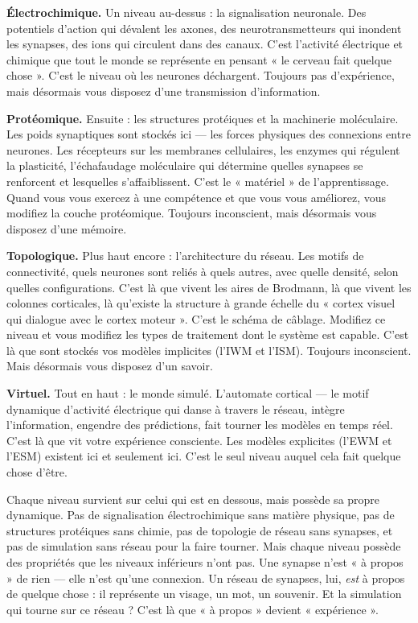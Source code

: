 \documentclass[11pt, twoside, openright]{book}
\begin{document}
\textbf{Électrochimique.} Un niveau au-dessus : la signalisation neuronale. Des potentiels d'action qui dévalent les axones, des neurotransmetteurs qui inondent les synapses, des ions qui circulent dans des canaux. C'est l'activité électrique et chimique que tout le monde se représente en pensant « le cerveau fait quelque chose ». C'est le niveau où les neurones déchargent. Toujours pas d'expérience, mais désormais vous disposez d'une transmission d'information.

\textbf{Protéomique.} Ensuite : les structures protéiques et la machinerie moléculaire. Les poids synaptiques sont stockés ici --- les forces physiques des connexions entre neurones. Les récepteurs sur les membranes cellulaires, les enzymes qui régulent la plasticité, l'échafaudage moléculaire qui détermine quelles synapses se renforcent et lesquelles s'affaiblissent. C'est le « matériel » de l'apprentissage. Quand vous vous exercez à une compétence et que vous vous améliorez, vous modifiez la couche protéomique. Toujours inconscient, mais désormais vous disposez d'une mémoire.

\textbf{Topologique.} Plus haut encore : l'architecture du réseau. Les motifs de connectivité, quels neurones sont reliés à quels autres, avec quelle densité, selon quelles configurations. C'est là que vivent les aires de Brodmann, là que vivent les colonnes corticales, là qu'existe la structure à grande échelle du « cortex visuel qui dialogue avec le cortex moteur ». C'est le schéma de câblage. Modifiez ce niveau et vous modifiez les types de traitement dont le système est capable. C'est là que sont stockés vos modèles implicites (l'IWM et l'ISM). Toujours inconscient. Mais désormais vous disposez d'un savoir.

\textbf{Virtuel.} Tout en haut : le monde simulé. L'automate cortical --- le motif dynamique d'activité électrique qui danse à travers le réseau, intègre l'information, engendre des prédictions, fait tourner les modèles en temps réel. C'est là que vit votre expérience consciente. Les modèles explicites (l'EWM et l'ESM) existent ici et seulement ici. C'est le seul niveau auquel cela fait quelque chose d'être.

Chaque niveau survient sur celui qui est en dessous, mais possède sa propre dynamique. Pas de signalisation électrochimique sans matière physique, pas de structures protéiques sans chimie, pas de topologie de réseau sans synapses, et pas de simulation sans réseau pour la faire tourner. Mais chaque niveau possède des propriétés que les niveaux inférieurs n'ont pas. Une synapse n'est « à propos » de rien --- elle n'est qu'une connexion. Un réseau de synapses, lui, \textit{est} à propos de quelque chose : il représente un visage, un mot, un souvenir. Et la simulation qui tourne sur ce réseau ? C'est là que « à propos » devient « expérience ».
\end{document}
